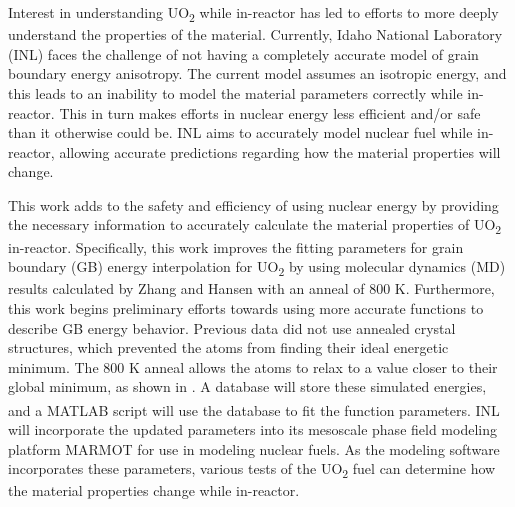 \documentclass[12pt]{report}
\begin{document}
Interest in understanding UO\textsubscript{2} while in-reactor has led to efforts to more deeply understand the properties of the material.  Currently, Idaho National Laboratory (INL) faces the challenge of not having a completely accurate model of grain boundary energy anisotropy.  The current model assumes an isotropic energy, and this leads to an inability to model the material parameters correctly while in-reactor.  This in turn makes efforts in nuclear energy less efficient and/or safe than it otherwise could be.  INL aims to accurately model nuclear fuel while in-reactor, allowing accurate predictions regarding how the material properties will change.

This work adds to the safety and efficiency of using nuclear energy by providing the necessary information to accurately calculate the material properties of UO\textsubscript{2} in-reactor.  Specifically, this work improves the fitting parameters for grain boundary (GB) energy interpolation for UO\textsubscript{2} by using molecular dynamics (MD) results calculated by Zhang\cite{zhang2016} and Hansen\cite{hansen2016} with an anneal of 800 K.  Furthermore, this work begins preliminary efforts towards using more accurate functions to describe GB energy behavior.  Previous data did not use annealed crystal structures\cite{harbison2015}, which prevented the atoms from finding their ideal energetic minimum.  The 800 K anneal allows the atoms to relax to a value closer to their global minimum, as shown in .  A database will store these simulated energies, and a MATLAB\textsuperscript{\textregistered} script will use the database to fit the function parameters.  INL will incorporate the updated parameters into its mesoscale phase field modeling platform MARMOT for use in modeling nuclear fuels.  As the modeling software incorporates these parameters, various tests of the UO\textsubscript{2} fuel can determine how the material properties change while in-reactor.
\end{document}
